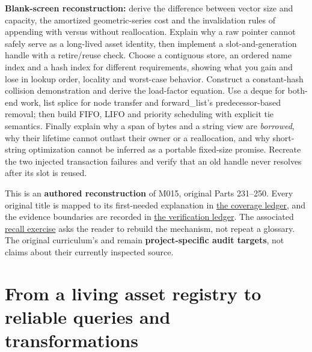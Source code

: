\textbf{Blank-screen reconstruction:} derive the difference between vector size and capacity, the amortized geometric-series cost and the invalidation rules of appending with versus without reallocation. Explain why a raw pointer cannot safely serve as a long-lived asset identity, then implement a slot-and-generation handle with a retire/reuse check. Choose a contiguous store, an ordered name index and a hash index for different requirements, showing what you gain and lose in lookup order, locality and worst-case behavior. Construct a constant-hash collision demonstration and derive the load-factor equation. Use a deque for both-end work, list splice for node transfer and forward\_list's predecessor-based removal; then build FIFO, LIFO and priority scheduling with explicit tie semantics. Finally explain why a span of bytes and a string view are \emph{borrowed}, why their lifetime cannot outlast their owner or a reallocation, and why short-string optimization cannot be inferred as a portable fixed-size promise. Recreate the two injected transaction failures and verify that an old handle never resolves after its slot is reused.

This is an \textbf{authored reconstruction} of M015, original Parts 231--250. Every original title is mapped to its first-needed explanation in \hyperref[appendix-fd090d982a15-m015-parts-231250-growing-the-asset-registry-without-losing-identities]{the coverage ledger}, and the evidence boundaries are recorded in \hyperref[appendix-a103e7846d21-phase-5-additive-reconstruction-m015-parts-231250]{the verification ledger}. The associated \hyperref[appendix-960160274237-a-growing-asset-store-must-preserve-its-promises-m015-retrieval]{recall exercise} asks the reader to rebuild the mechanism, not repeat a glossary. The original curriculum's  and  remain \textbf{project-specific audit targets}, not claims about their currently inspected source.

\section{From a living asset registry to reliable queries and transformations}\label{01-foundations-i-ch006-from-a-living-asset-registry-to-reliable-queries-and-transformations}

